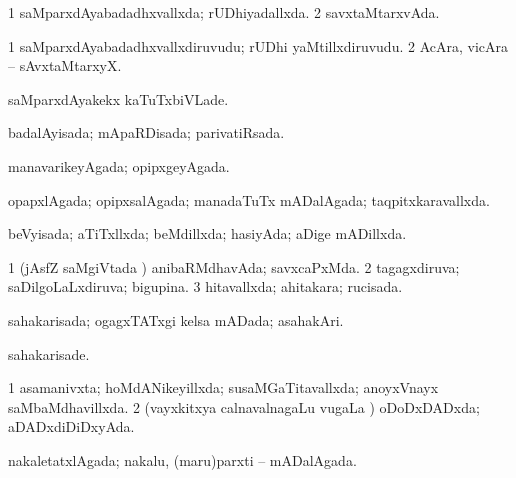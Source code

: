 {\bentry
{} 
\gl{\gu}
\expl{}
\bmng
\bnum
\num{1} saMparxdAyabadadhxvallxda; rUDhiyadallxda. 
\num{2} savxtaMtarxvAda. 
\enum
\emng
\eentry

\bentry
{}
\gl{\nA}
\expl{}
\bmng
\emng
\eentry

\bentry
{} 
\gl{\nA}
\expl{}
\bmng
\bnum
\num{1} saMparxdAyabadadhxvallxdiruvudu; rUDhi yaMtillxdiruvudu. 
\num{2} AcAra, vicAra -- sAvxtaMtarxyX. 
\enum
\emng
\eentry

\bentry
{} 
\gl{\kirxvi}
\expl{}
\bmng
 saMparxdAyakekx kaTuTxbiVLade. 
\emng
\eentry

\bentry
{} 
\gl{\gu}
\expl{}
\bmng
 badalAyisada; mApaRDisada; parivatiRsada. 
\emng
\eentry

\bentry
{} 
\gl{\gu}
\expl{}
\bmng
 manavarikeyAgada; opipxgeyAgada. 
\emng
\eentry

\bentry
{} 
\gl{\gu}
\expl{}
\bmng
 opapxlAgada; opipxsalAgada; manadaTuTx mADalAgada; taqpitxkaravallxda. 
\emng
\eentry

\bentry
{} 
\gl{\gu}
\expl{}
\bmng
 beVyisada; aTiTxllxda; beMdillxda; hasiyAda; aDige mADillxda. 
\emng
\eentry

\bentry
{} 
\gl{\gu}
\bmng
\bnum
\num{1} (jAsfZ saMgiVtada \vi) anibaRMdhavAda; savxcaPxMda. 
\num{2} tagagxdiruva; saDilgoLaLxdiruva; bigupina. 
\num{3} hitavallxda; ahitakara; rucisada. 
\enum
\emng
\eentry

\bentry
{} 
\gl{\gu}
\expl{}
\bmng
 sahakarisada; ogagxTATxgi kelsa mADada; asahakAri. 
\emng
\eentry

\bentry
{} 
\gl{\kirxvi}
\expl{}
\bmng
 sahakarisade. 
\emng
\eentry

\bentry
{} 
\gl{\gu}
\expl{}
\bmng
\bnum
\num{1} asamanivxta; hoMdANikeyillxda; susaMGaTitavallxda; anoyxVnayx saMbaMdhavillxda. 
\num{2} (vayxkitxya calnavalnagaLu \mo vugaLa \vi) oDoDxDADxda; aDADxdiDiDxyAda. 
\enum
\emng
\eentry

\bentry
{} 
\gl{\gu}
\expl{}
\bmng
nakaletatxlAgada; nakalu, (maru)parxti -- mADalAgada. 
\emng
\eentry

}
